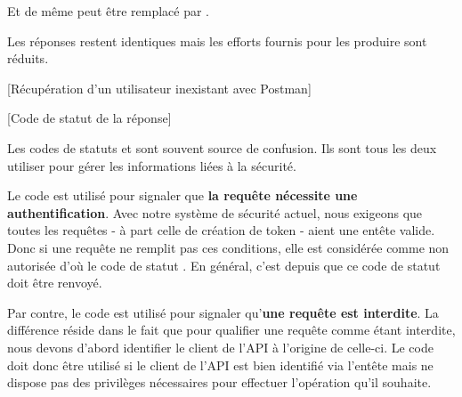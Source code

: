 \documentclass[big]{zmdocument}
\begin{document}
Et de même  peut être remplacé par .



Les réponses restent identiques mais les efforts fournis pour les produire sont réduits.



[Récupération d'un utilisateur inexistant avec Postman]


[Code de statut de la réponse]




Les codes de statuts  et  sont souvent source de confusion. Ils sont tous les deux utiliser pour gérer les informations liées à la sécurité.



Le code  est utilisé pour signaler que \textbf{la requête nécessite une authentification}. Avec notre système de sécurité actuel, nous exigeons que toutes les requêtes - à part celle de création de token - aient une entête  valide.
Donc si une requête ne remplit pas ces conditions, elle est considérée comme non autorisée d'où le code de statut .
En général, c'est depuis  que ce code de statut doit être renvoyé.



Par contre, le code  est utilisé pour signaler qu'\textbf{une requête est interdite}. La différence réside dans le fait que pour qualifier une requête comme étant interdite, nous devons d'abord identifier le client de l'API à l'origine de celle-ci. Le code  doit donc être utilisé si le client de l'API est bien identifié via l'entête  mais ne dispose pas des privilèges nécessaires pour effectuer l'opération qu'il souhaite.
\end{document}
